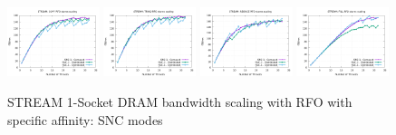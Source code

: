 \documentclass{article}
\begin{document}
\begin{figure}[!hb]
    \centering
    \includegraphics[width=0.24\textwidth]{../data/icx-32c-snc/mem_bw_scale/mb_scale_special_Copy_rfo}
    \includegraphics[width=0.24\textwidth]{../data/icx-32c-snc/mem_bw_scale/mb_scale_special_Triad_rfo}
    \includegraphics[width=0.24\textwidth]{../data/icx-32c-snc/mem_bw_scale/mb_scale_special_Reduce_rfo}
    \includegraphics[width=0.24\textwidth]{../data/icx-32c-snc/mem_bw_scale/mb_scale_special_Fill_rfo}
    \caption{STREAM 1-Socket DRAM bandwidth scaling with RFO with specific affinity: SNC modes}
    \label{figure:mem_bw_scale_special_rfo_icx_snc}
\end{figure}
\end{document}
